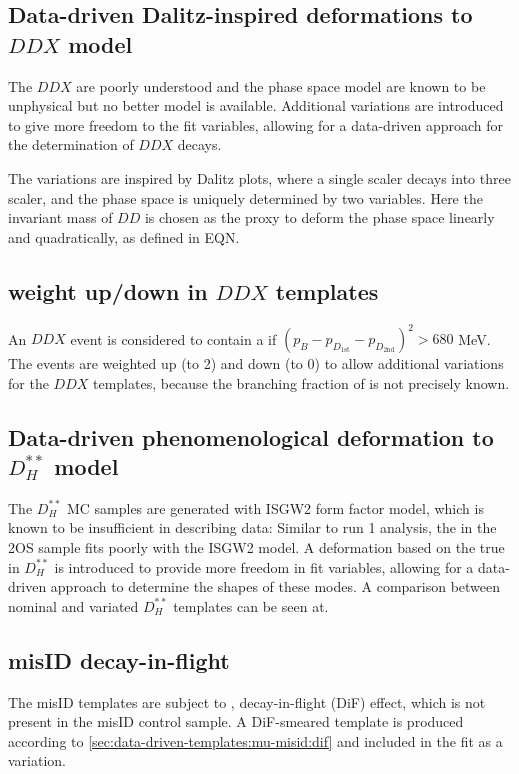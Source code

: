 \subsection{Data-driven Dalitz-inspired deformations to $DDX$ model}
\label{sec:fit-to-data:fit-tmpl-vars:ddx}

The $DDX$ are poorly understood and the phase space model are known to be
unphysical but no better model is available.
Additional variations are introduced to give more freedom to the fit variables,
allowing for a data-driven approach for the determination of $DDX$ decays.

The variations are inspired by Dalitz plots, where a single scaler decays into
three scaler, and the phase space is uniquely determined by two variables.
Here the invariant mass of $DD$ is chosen as the proxy to deform the phase
space linearly and quadratically, as defined in EQN.


\subsection{\Kstar weight up/down in $DDX$ templates}

An $DDX$ event is considered to contain a \Kstar if
$(p_B - p_{D_\text{1st}} - p_{D_\text{2nd}})^2 > 680$ MeV.
The \Kstar events are weighted up (to 2) and down (to 0) to allow additional
variations for the $DDX$ templates, because the
branching fraction of \Kstar is not precisely known.


\subsection{Data-driven phenomenological deformation to $D_H^{**}$ model}

The $D_H^{**}$ MC samples are generated with ISGW2 form factor model, which
is known to be insufficient in describing data:
Similar to run 1 analysis, the \qSq in the 2OS sample fits poorly with the ISGW2
model.
A deformation based on the true \qSq
in $D_H^{**}$ is introduced to provide more freedom in fit variables,
allowing for a data-driven approach to determine the shapes of these modes.
A comparison between nominal and variated $D_H^{**}$ templates can be seen at.


\subsection{misID decay-in-flight}
\label{ref:fit:tmpl:misid:dif}

The \muon misID templates are subject to \kaon, \pion decay-in-flight (DiF)
effect,
which is not present in the \muon misID control sample.
A DiF-smeared template is produced according to
\cref{sec:data-driven-templates:mu-misid:dif} and included in the fit as a
variation.


